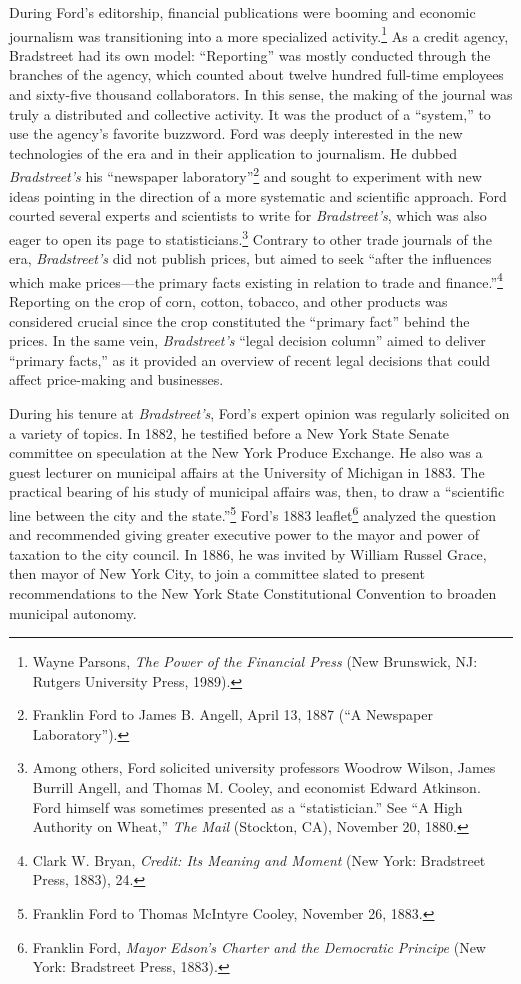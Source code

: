 \documentclass[openany,nobib]{tufte-book}
\begin{document}
During Ford's editorship, financial publications were booming and
economic journalism was transitioning into a more specialized
activity.\footnote{Wayne Parsons, \emph{The Power of the Financial
  Press} (New Brunswick, NJ: Rutgers University Press, 1989).} As a
credit agency, Bradstreet had its own model: ``Reporting'' was mostly
conducted through the branches of the agency, which counted about twelve
hundred full-time employees and sixty-five thousand collaborators. In
this sense, the making of the journal was truly a distributed and
collective activity. It was the product of a ``system,'' to use the
agency's favorite buzzword. Ford was deeply interested in the new
technologies of the era and in their application to journalism. He
dubbed \emph{Bradstreet's} his ``newspaper laboratory''\footnote{Franklin
  Ford to James B. Angell, April 13, 1887 (``A Newspaper Laboratory'').}
and sought to experiment with new ideas pointing in the direction of a
more systematic and scientific approach. Ford courted several experts
and scientists to write for \emph{Bradstreet's}, which was also eager to
open its page to statisticians.\footnote{Among others, Ford solicited
  university professors Woodrow Wilson, James Burrill Angell, and Thomas
  M. Cooley, and economist Edward Atkinson. Ford himself was sometimes
  presented as a ``statistician.'' See ``A High Authority on Wheat,''
  \emph{The Mail} (Stockton, CA), November 20, 1880.} Contrary to other
trade journals of the era, \emph{Bradstreet's} did not publish prices,
but aimed to seek ``after the influences which make prices---the primary
facts existing in relation to trade and finance.''\footnote{Clark W.
  Bryan, \emph{Credit: Its Meaning and Moment} (New York: Bradstreet
  Press, 1883), 24.} Reporting on the crop of corn, cotton, tobacco, and
other products was considered crucial since the crop constituted the
``primary fact'' behind the prices. In the same vein,
\emph{Bradstreet's} ``legal decision column'' aimed to deliver ``primary
facts,'' as it provided an overview of recent legal decisions that could
affect price-making and businesses.

During his tenure at \emph{Bradstreet's}, Ford's expert opinion was
regularly solicited on a variety of topics. In 1882, he testified before
a New York State Senate committee on speculation at the New York Produce
Exchange. He also was a guest lecturer on municipal affairs at the
University of Michigan in 1883. The practical bearing of his study of
municipal affairs was, then, to draw a ``scientific line between the
city and the state.''\footnote{Franklin Ford to Thomas McIntyre Cooley,
  November 26, 1883.} Ford's 1883 leaflet\footnote{Franklin Ford,
  \emph{Mayor Edson's Charter and the Democratic Principe} (New York:
  Bradstreet Press, 1883).} analyzed the question and recommended giving
greater executive power to the mayor and power of taxation to the city
council. In 1886, he was invited by William Russel Grace, then mayor of
New York City, to join a committee slated to present recommendations to
the New York State Constitutional Convention to broaden municipal
autonomy.
\end{document}
